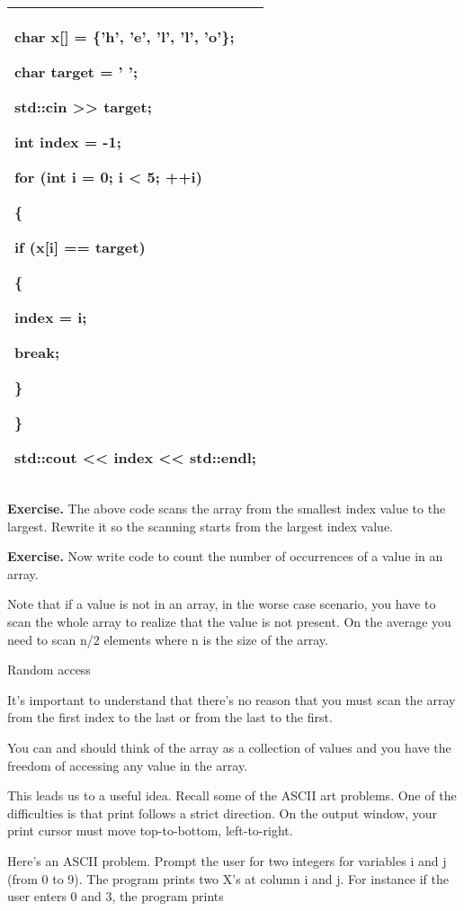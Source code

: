 \documentclass[
]{article}
\begin{document}
\begin{longtable}[]{@{}l@{}}
\toprule
\endhead
\begin{minipage}[t]{0.97\columnwidth}\raggedright
char x{[}{]} = \{'h', 'e', 'l', 'l', 'o'\};

char target = ' ';

std::cin \textgreater\textgreater{} target;

int index = -1;

for (int i = 0; i \textless{} 5; ++i)

\{

if (x{[}i{]} == target)

\{

index = i;

break;

\}

\}

std::cout \textless\textless{} index \textless\textless{}
std::endl;\strut
\end{minipage}\tabularnewline
\bottomrule
\end{longtable}

\textbf{Exercise.} The above code scans the array from the smallest
index value to the largest. Rewrite it so the scanning starts from the
largest index value.

\textbf{Exercise.} Now write code to count the number of occurrences of
a value in an array.

Note that if a value is not in an array, in the worse case scenario, you
have to scan the whole array to realize that the value is not present.
On the average you need to scan n/2 elements where n is the size of the
array.

Random access

It's important to understand that there's no reason that you must scan
the array from the first index to the last or from the last to the
first.

You can and should think of the array as a collection of values and you
have the freedom of accessing any value in the array.

This leads us to a useful idea. Recall some of the ASCII art problems.
One of the difficulties is that print follows a strict direction. On the
output window, your print cursor must move top-to-bottom, left-to-right.

Here's an ASCII problem. Prompt the user for two integers for variables
i and j (from 0 to 9). The program prints two X's at column i and j. For
instance if the user enters 0 and 3, the program prints
\end{document}
